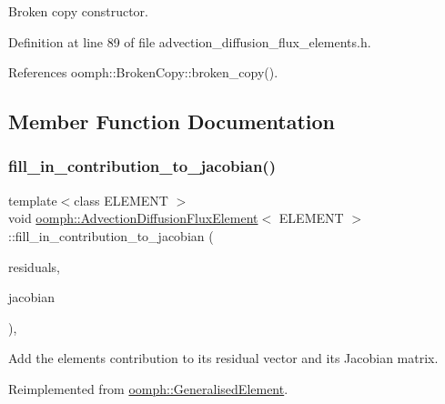 Broken copy constructor. 



Definition at line 89 of file advection\+\_\+diffusion\+\_\+flux\+\_\+elements.\+h.



References oomph\+::\+Broken\+Copy\+::broken\+\_\+copy().



\subsection{Member Function Documentation}
\mbox{\label{classoomph_1_1AdvectionDiffusionFluxElement_a5c8e409a31f90858e556fe359b996b9d}} 
\subsubsection{\texorpdfstring{fill\+\_\+in\+\_\+contribution\+\_\+to\+\_\+jacobian()}{fill\_in\_contribution\_to\_jacobian()}}
{\footnotesize\ttfamily template$<$class E\+L\+E\+M\+E\+NT $>$ \\
void \hyperlink{classoomph_1_1AdvectionDiffusionFluxElement}{oomph\+::\+Advection\+Diffusion\+Flux\+Element}$<$ E\+L\+E\+M\+E\+NT $>$\+::fill\+\_\+in\+\_\+contribution\+\_\+to\+\_\+jacobian (\begin{DoxyParamCaption}\item[{\hyperlink{classoomph_1_1Vector}{Vector}$<$ double $>$ \&}]{residuals,  }\item[{\hyperlink{classoomph_1_1DenseMatrix}{Dense\+Matrix}$<$ double $>$ \&}]{jacobian }\end{DoxyParamCaption})\hspace{0.3cm}{\ttfamily [inline]}, {\ttfamily [virtual]}}



Add the element\textquotesingle{}s contribution to its residual vector and its Jacobian matrix. 



Reimplemented from \hyperlink{classoomph_1_1GeneralisedElement_a6ae09fc0d68e4309ac1b03583d252845}{oomph\+::\+Generalised\+Element}.



